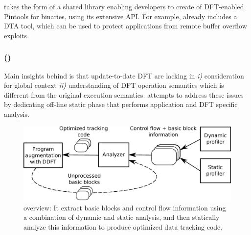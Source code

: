 \libdft takes the form of a shared library enabling developers to create of
DFT-enabled Pintools for binaries, using its extensive API. For example,
\libdft already includes a DTA tool, which can be used to protect applications
from remote buffer overflow exploits.

\subsubsection{\tfafull (\tfa)} 

Main insights behind \tfa is that update-to-date DFT are lacking in {\it i)}
consideration for global context {\it ii)} understanding of DFT operation
semantics which is different from the original execution semantics.  \tfa
attempts to address these issues by dedicating off-line static phase that
performs application and DFT specific analysis. 

\begin{figure}[tb]
    \centering
    \includegraphics[width=0.65\linewidth]{figs/overview_model.eps}
    \caption{\tfa overview: It extract basic blocks and control flow
    information using a combination of dynamic and static analysis, and then
    statically analyze this information to produce optimized data tracking
    code.
   \label{fig:approach_overview}}
\end{figure}


